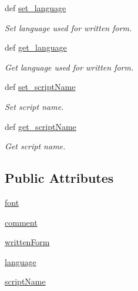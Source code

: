 \begin{DoxyCompactItemize}
def \hyperlink{classlmf_1_1src_1_1core_1_1text__representation_1_1_text_representation_a00be4c8e0a058f9df2605abb27ac8853}{set\+\_\+language}
\begin{DoxyCompactList}\small\item\em Set language used for written form. \end{DoxyCompactList}\item 
def \hyperlink{classlmf_1_1src_1_1core_1_1text__representation_1_1_text_representation_a1ec2b944809b0503bc1bb07b034eef5b}{get\+\_\+language}
\begin{DoxyCompactList}\small\item\em Get language used for written form. \end{DoxyCompactList}\item 
def \hyperlink{classlmf_1_1src_1_1core_1_1text__representation_1_1_text_representation_ae7d072249f81b508e86b086fd80f27a7}{set\+\_\+script\+Name}
\begin{DoxyCompactList}\small\item\em Set script name. \end{DoxyCompactList}\item 
def \hyperlink{classlmf_1_1src_1_1core_1_1text__representation_1_1_text_representation_aba63d43929e12252bc2ac535b6d3f563}{get\+\_\+script\+Name}
\begin{DoxyCompactList}\small\item\em Get script name. \end{DoxyCompactList}\end{DoxyCompactItemize}
\subsection*{Public Attributes}
\begin{DoxyCompactItemize}
\item 
\hyperlink{classlmf_1_1src_1_1core_1_1text__representation_1_1_text_representation_a78df11b119c24be8b18e6f121e0bb802}{font}
\item 
\hyperlink{classlmf_1_1src_1_1core_1_1text__representation_1_1_text_representation_af0026ed9d19dd869b408fba84f6fa5b1}{comment}
\item 
\hyperlink{classlmf_1_1src_1_1core_1_1text__representation_1_1_text_representation_a029a488706154d5fe42ecbea00974780}{written\+Form}
\item 
\hyperlink{classlmf_1_1src_1_1core_1_1text__representation_1_1_text_representation_aba23f79743bc4aa642f344aec09a3807}{language}
\item 
\hyperlink{classlmf_1_1src_1_1core_1_1text__representation_1_1_text_representation_a1aeda3c7310f02affa313c8797bfaf65}{script\+Name}
\end{DoxyCompactItemize}


